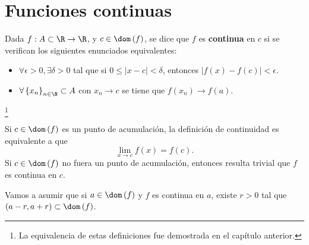 \chapter{Funciones continuas}
\begin{fdefinition}[Continuidad]
\normalfont Dada $\displaystyle f : A \subset \R \to \R $,  y $\displaystyle c \in \dom\left(f\right) $, se dice que $\displaystyle f $ es \textbf{continua} en $\displaystyle c $ si se verifican los siguientes enunciados equivalentes:
\begin{itemize}
\item $\displaystyle \forall \epsilon > 0, \exists \delta > 0 $ tal que si $\displaystyle 0 \leq \left|x - c\right|<\delta $, entonces $\displaystyle \left|f\left(x\right)-f\left(c\right)\right| < \epsilon  $.
\item $\displaystyle \forall \left\{ x_{n}\right\} _{n\in \N} \subset A $ con $\displaystyle x_{n} \to c $ se tiene que $\displaystyle f\left(x_{n}\right) \to f\left(a\right) $.
\end{itemize}
\end{fdefinition}
\footnote{La equivalencia de estas definiciones fue demostrada en el capítulo anterior.} 
\begin{observation}
\normalfont Si $\displaystyle c \in \dom\left(f\right) $ es un punto de acumulación, la definición de continuidad es equivalente a que 
\[\lim_{x \to c}f\left(x\right) = f\left(c\right) .\]
Si $\displaystyle c \in \dom\left(f\right) $ no fuera un punto de acumulación, entonces resulta trivial que $\displaystyle f $ es continua en $\displaystyle c $. 
\end{observation}
\begin{observation}
\normalfont Vamos a asumir que si $\displaystyle a \in \dom\left(f\right) $ y $\displaystyle f $ es continua en $\displaystyle a $, existe $\displaystyle r > 0 $ tal que $\displaystyle \left(a - r, a + r\right) \subset \dom\left(f\right) $.
\end{observation}

